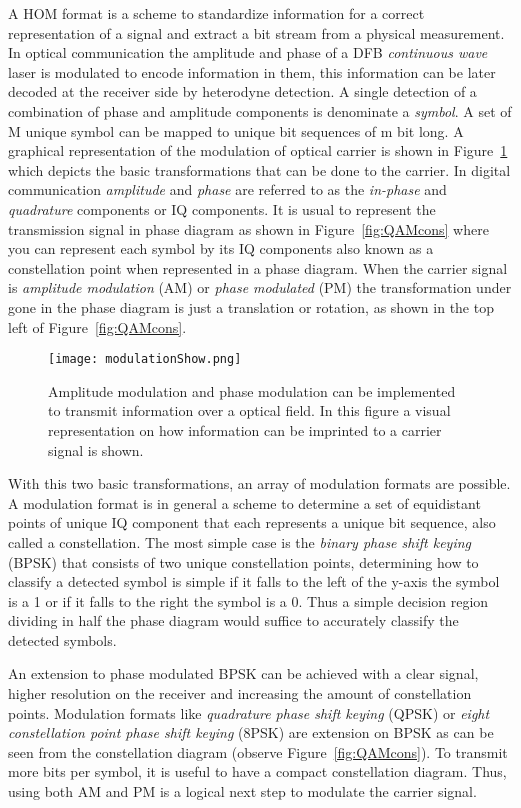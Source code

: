  
 A HOM format is a scheme to standardize information for a correct representation of a signal and extract a bit stream from a physical measurement. In optical communication the amplitude and phase of a DFB \textit{continuous wave} laser is modulated to encode information in them, this information can be later decoded at the receiver side by heterodyne detection. A single detection of a combination of phase and amplitude components is denominate a \textit{symbol}. A set of M unique symbol can be mapped to unique bit sequences of m bit long. A graphical representation of the modulation  of  optical carrier is shown in Figure~\ref{fig:AmPm} which depicts the basic transformations that can be done to the carrier. In digital communication  \textit{amplitude} and \textit{phase} are referred to as the \textit{in-phase} and \textit{quadrature} components or IQ components. It is usual to represent the transmission signal in phase diagram as shown in Figure~\ref{fig:QAMcons} where you can represent each symbol by its IQ components also known as a constellation point when represented in a phase diagram. When the carrier signal is  \textit{amplitude modulation} (AM) or \textit{phase modulated} (PM) the transformation under gone in the phase diagram is just a translation or rotation, as shown in the top left of Figure~\ref{fig:QAMcons}.
 
  \begin{figure}[h]
 \centering
 \texttt{[image: modulationShow.png]}
 \caption{Amplitude modulation and phase modulation can be implemented to transmit information over a optical field. In this figure a visual representation on how information can be imprinted to a carrier signal is shown. }
 \label{fig:AmPm}
 \end{figure}
 With this two basic transformations, an array of modulation formats are possible. A modulation format is in general a scheme to determine a set of equidistant points of unique IQ component that each represents a unique bit sequence, also called a constellation. The most simple case is the \textit{binary phase shift keying} (BPSK) that consists of two unique constellation points, determining how to classify a detected symbol is simple if it falls to the left of the y-axis the symbol is a 1 or if it falls to the right the symbol is a 0. Thus a simple decision region dividing in half the phase diagram would suffice to accurately classify the detected symbols.
 
  An extension to phase modulated BPSK can be achieved with a clear signal, higher resolution on the receiver and increasing the amount of constellation points. Modulation formats like \textit{quadrature phase shift keying} (QPSK) or \textit{eight constellation point phase shift keying} (8PSK) are extension on BPSK as can be seen from the constellation diagram (observe Figure~\ref{fig:QAMcons}). To transmit more bits per symbol, it is useful to have a compact constellation diagram. Thus, using both AM and PM is a logical next step to modulate the carrier signal.
 
